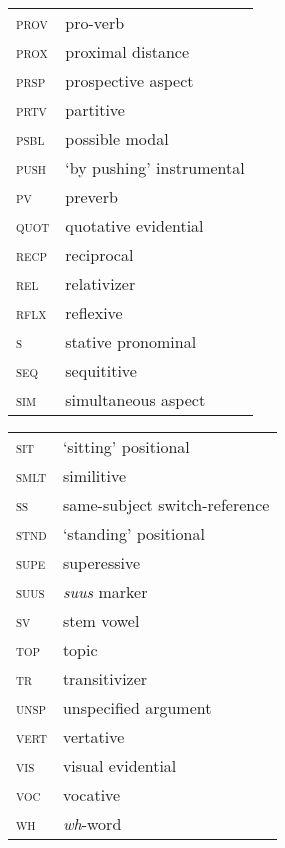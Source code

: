 \begin{tabularx}{.45\textwidth}{lQ}
        \textsc{prov} & pro-verb\\
        \textsc{prox} & proximal distance \\ 
        \textsc{prsp} & prospective aspect \\ 
        \textsc{prtv} & partitive \\ 
        \textsc{psbl} & possible modal\\
        \textsc{push} & `by pushing' instrumental \\ 
        \textsc{pv} & preverb \\ 
        \textsc{quot} & quotative evidential \\ 
        \textsc{recp} & reciprocal \\ 
        \textsc{rel} & relativizer \\ 
        \textsc{rflx} & reflexive \\ 
        \textsc{s} & stative pronominal \\ 
        \textsc{seq} & sequititive \\ 
        \textsc{sim} & simultaneous aspect \\ 
\end{tabularx}
\begin{tabularx}{.45\textwidth}{lQ}
        \textsc{sit} & `sitting' positional \\ 
        \textsc{smlt} & similitive \\ 
        \textsc{ss} & same-subject switch-reference \\ 
        \textsc{stnd} & `standing' positional \\ 
        \textsc{supe} & superessive \\ 
        \textsc{suus} & \textit{suus} marker \\ 
        \textsc{sv} & stem vowel\\
        \textsc{top} & topic \\ 
        \textsc{tr} & transitivizer \\ 
        \textsc{unsp} & unspecified argument \\ 
        \textsc{vert} & vertative \\ 
        \textsc{vis} & visual evidential\\
        \textsc{voc} & vocative \\ 
        \textsc{wh} & \textit{wh}-word \\ 
\end{tabularx}

